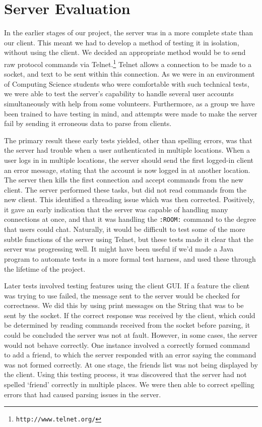 \section{Server Evaluation}
\label{server_eval}

In the earlier stages of our project, the server was in a more complete state than our client. This meant we had to develop a method of testing it in isolation, without using the client. We decided an appropriate method would be to send raw protocol commands via Telnet.\footnote{\texttt{http://www.telnet.org/}} Telnet allows a connection to be made to a socket, and text to be sent within this connection. As we were in an environment of Computing Science students who were comfortable with such technical tests, we were able to test the server's capability to handle several user accounts simultaneously with help from some volunteers. Furthermore, as a group we have been trained to have testing in mind, and attempts were made to make the server fail by sending it erroneous data to parse from clients.

The primary result these early tests yielded, other than spelling errors, was that the server had trouble when a user authenticated in multiple locations. When a user logs in in multiple locations, the server should send the first logged-in client an error message, stating that the account is now logged in at another location. The server then kills the first connection and accept commands from the new client. The server performed these tasks, but did not read commands from the new client. This identified a threading issue which was then corrected. Positively, it gave an early indication that the server was capable of handling many connections at once, and that it was handling the \texttt{:ROOM:} command to the degree that users could chat. Naturally, it would be difficult to test some of the more subtle functions of the server using Telnet, but these tests made it clear that the server was progressing well. It might have been useful if we'd made a Java program to automate tests in a more formal test harness, and used these through the lifetime of the project. 	

Later tests involved testing features using the client GUI. If a feature the client was trying to use failed, the message sent to the server would be checked for correctness. We did this by using print messages on the String that was to be sent by the socket. If the correct response was received by the client, which could be determined by reading commands received from the socket before parsing, it could be concluded the server was not at fault. However, in some cases, the server would not behave correctly. One instance involved a correctly formed command to add a friend, to which the server responded with an error saying the command was not formed correctly. At one stage, the friends list was not being displayed by the client. Using this testing process, it was discovered that the server had not spelled `friend' correctly in multiple places. We were then able to correct spelling errors that had caused parsing issues in the server. 

